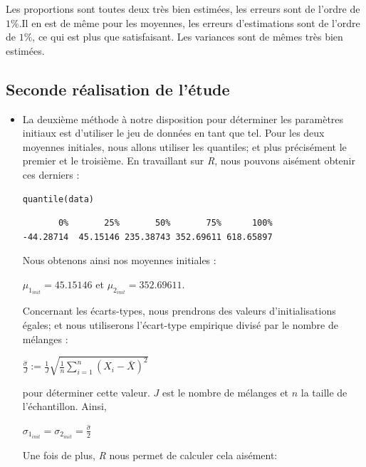 \documentclass[frenchb]{report}
\newcommand{\1}{\mathbbm{1}}
\theoremstyle{definition}\newtheorem{defn}{Définition}
\theoremstyle{definition}\newtheorem{exm}{Exemple}
\theoremstyle{definition}\newtheorem{nota}{Notation}
\theoremstyle{definition}\newtheorem{rem}{Remarque}
\begin{document}
\begin{itemize}[label=\adfflowerleft]
Les proportions sont toutes deux très bien estimées, les erreurs sont de l'ordre de $1\%$.Il en est de même pour les moyennes, les erreurs d'estimations sont de l'ordre de $1\%$, ce qui est plus que satisfaisant. Les variances sont de mêmes très bien estimées.


\subsection{Seconde réalisation de l'étude}

\begin{itemize}[label=\adfflowerleft]

\item La deuxième méthode à notre disposition pour déterminer les paramètres initiaux est d'utiliser le jeu de données en tant que tel. Pour les deux moyennes initiales, nous allons utiliser les quantiles; et plus précisément le premier et le troisième. En travaillant sur \textit{R}, nous pouvons aisément obtenir ces derniers :

\begin{lstlisting}
quantile(data)
\end{lstlisting}


\begin{verbatim}
       0%       25%       50%       75%      100% 
-44.28714  45.15146 235.38743 352.69611 618.65897
\end{verbatim}
Nous obtenons ainsi nos moyennes initiales :
\begin{center} 
$\mu_{1_{init}} =  45.15146$ et $\mu_{2_{init}} = 352.69611$. 
\end{center}

Concernant les écarts-types, nous prendrons des valeurs d'initialisations égales; et nous utiliserons l'écart-type empirique divisé par le nombre de mélanges :
\begin{center}
$\displaystyle\frac{\widehat{\sigma}}{J} := \displaystyle\frac{1}{J}\sqrt{\displaystyle\frac{1}{n}\sum_{i=1}^n(X_i - \bar{X})^2}$
\end{center}
pour déterminer cette valeur. $J$ est le nombre de mélanges et $n$ la taille de l'échantillon. \newline
Ainsi, 
\begin{center}
$\sigma_{1_{init}} = \sigma_{2_{init}} = \displaystyle\frac{\widehat{\sigma}}{2}$
\end{center}

Une fois de plus, \textit{R} nous permet de calculer cela aisément: 


\end{itemize}
\end{itemize}
\end{document}
